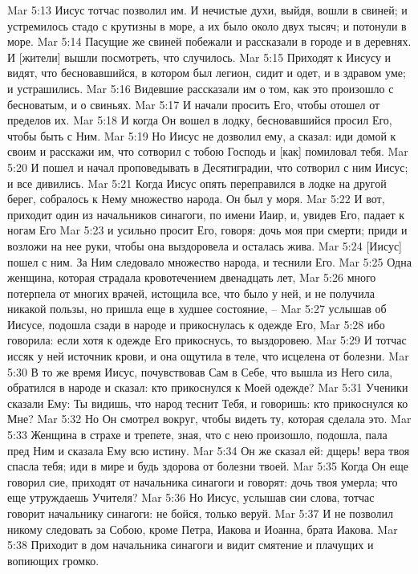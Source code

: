 Mar 5:13  Иисус тотчас позволил им. И нечистые духи, выйдя, вошли в свиней; и устремилось стадо с крутизны в море, а их было около двух тысяч; и потонули в море.
Mar 5:14  Пасущие же свиней побежали и рассказали в городе и в деревнях. И [жители] вышли посмотреть, что случилось.
Mar 5:15  Приходят к Иисусу и видят, что бесновавшийся, в котором был легион, сидит и одет, и в здравом уме; и устрашились.
Mar 5:16  Видевшие рассказали им о том, как это произошло с бесноватым, и о свиньях.
Mar 5:17  И начали просить Его, чтобы отошел от пределов их.
Mar 5:18  И когда Он вошел в лодку, бесновавшийся просил Его, чтобы быть с Ним.
Mar 5:19  Но Иисус не дозволил ему, а сказал: иди домой к своим и расскажи им, что сотворил с тобою Господь и [как] помиловал тебя.
Mar 5:20  И пошел и начал проповедывать в Десятиградии, что сотворил с ним Иисус; и все дивились.
Mar 5:21  Когда Иисус опять переправился в лодке на другой берег, собралось к Нему множество народа. Он был у моря.
Mar 5:22  И вот, приходит один из начальников синагоги, по имени Иаир, и, увидев Его, падает к ногам Его
Mar 5:23  и усильно просит Его, говоря: дочь моя при смерти; приди и возложи на нее руки, чтобы она выздоровела и осталась жива.
Mar 5:24  [Иисус] пошел с ним. За Ним следовало множество народа, и теснили Его.
Mar 5:25  Одна женщина, которая страдала кровотечением двенадцать лет,
Mar 5:26  много потерпела от многих врачей, истощила все, что было у ней, и не получила никакой пользы, но пришла еще в худшее состояние, --
Mar 5:27  услышав об Иисусе, подошла сзади в народе и прикоснулась к одежде Его,
Mar 5:28  ибо говорила: если хотя к одежде Его прикоснусь, то выздоровею.
Mar 5:29  И тотчас иссяк у ней источник крови, и она ощутила в теле, что исцелена от болезни.
Mar 5:30  В то же время Иисус, почувствовав Сам в Себе, что вышла из Него сила, обратился в народе и сказал: кто прикоснулся к Моей одежде?
Mar 5:31  Ученики сказали Ему: Ты видишь, что народ теснит Тебя, и говоришь: кто прикоснулся ко Мне?
Mar 5:32  Но Он смотрел вокруг, чтобы видеть ту, которая сделала это.
Mar 5:33  Женщина в страхе и трепете, зная, что с нею произошло, подошла, пала пред Ним и сказала Ему всю истину.
Mar 5:34  Он же сказал ей: дщерь! вера твоя спасла тебя; иди в мире и будь здорова от болезни твоей.
Mar 5:35  Когда Он еще говорил сие, приходят от начальника синагоги и говорят: дочь твоя умерла; что еще утруждаешь Учителя?
Mar 5:36  Но Иисус, услышав сии слова, тотчас говорит начальнику синагоги: не бойся, только веруй.
Mar 5:37  И не позволил никому следовать за Собою, кроме Петра, Иакова и Иоанна, брата Иакова.
Mar 5:38  Приходит в дом начальника синагоги и видит смятение и плачущих и вопиющих громко.
